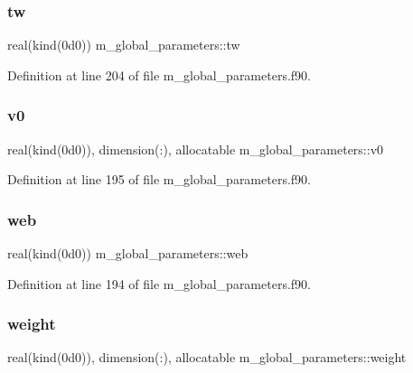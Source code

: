 \subsubsection{\texorpdfstring{tw}{tw}}
{\footnotesize\ttfamily real(kind(0d0)) m\+\_\+global\+\_\+parameters\+::tw}



Definition at line 204 of file m\+\_\+global\+\_\+parameters.\+f90.

\mbox{\label{namespacem__global__parameters_a334b440356a4353d073c43e68c2372da}} 
\subsubsection{\texorpdfstring{v0}{v0}}
{\footnotesize\ttfamily real(kind(0d0)), dimension(\+:), allocatable m\+\_\+global\+\_\+parameters\+::v0}



Definition at line 195 of file m\+\_\+global\+\_\+parameters.\+f90.

\mbox{\label{namespacem__global__parameters_af2ed21959a90158c2459574230cdfcff}} 
\subsubsection{\texorpdfstring{web}{web}}
{\footnotesize\ttfamily real(kind(0d0)) m\+\_\+global\+\_\+parameters\+::web}



Definition at line 194 of file m\+\_\+global\+\_\+parameters.\+f90.

\mbox{\label{namespacem__global__parameters_a121ed97f0ae913d37bce5bbf1c7b2cc2}} 
\subsubsection{\texorpdfstring{weight}{weight}}
{\footnotesize\ttfamily real(kind(0d0)), dimension(\+:), allocatable m\+\_\+global\+\_\+parameters\+::weight}



